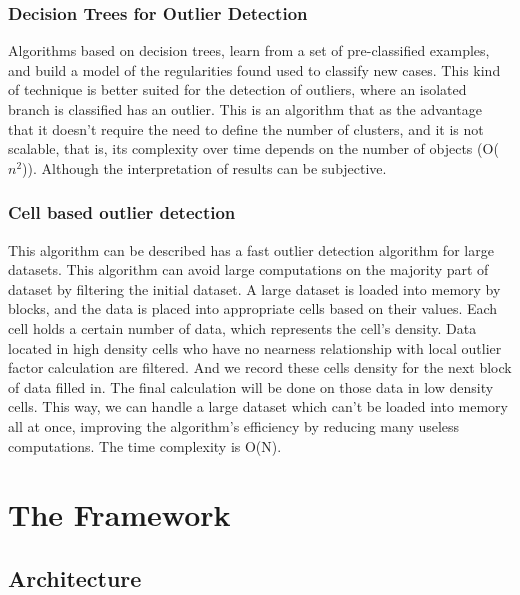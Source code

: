 \documentclass{llncs}
\begin{document}
\subsubsection{Decision Trees for Outlier Detection}
Algorithms based on decision trees, learn from a set of pre-classified examples, and build a model of the regularities found used to classify new cases.
This kind of technique is better suited for the detection of outliers, where an isolated branch is classified has an outlier.
This is an algorithm that as the advantage that it doesn't require the need to define the number of clusters, and it is not scalable, that is, its complexity over time depends on the number of objects (O($n^2$)). Although the interpretation of results can be subjective.

\subsubsection{Cell based outlier detection}
This algorithm can be described has a fast outlier detection algorithm for large datasets. This algorithm can avoid large computations on the majority part of dataset by filtering the initial dataset.
A large dataset is loaded into memory by blocks, and the data is placed into appropriate cells based on their values. Each cell holds a certain number of data, which represents the cell's density. Data located in high density cells who have no nearness relationship with local outlier factor calculation are filtered. And we record these cells density for the next block of data filled in. The final calculation will be done on those data in low density cells. This way, we can handle a large dataset which can't be loaded into memory all at once, improving the algorithm's efficiency by reducing many useless computations. The time complexity is O(N).


\section{The Framework}

\subsection{Architecture}
\end{document}
